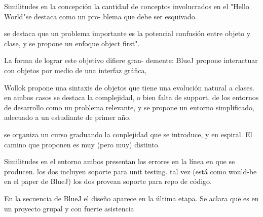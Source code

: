 Similitudes en la concepción
la cantidad de conceptos involucrados en el "Hello World"se destaca como un pro-
blema que debe ser esquivado.

se destaca que un problema importante es la potencial confusión entre objeto y clase,
y se propone un enfoque object first". 


La forma de lograr este objetivo difiere gran-
demente: BlueJ propone interactuar con objetos por medio de una interfaz gráfica,

Wollok propone una sintaxis de objetos que tiene una evolución natural a clases.
en ambos casos se destaca la complejidad, o bien falta de support, de los entornos
de desarrollo como un problema relevante, y se propone un entorno simplificado,
adecuado a un estudiante de primer año.

se organiza un curso graduando la conplejidad que se introduce, y en espiral. El
camino que proponen es muy (pero muy) distinto.

Similitudes en el entorno
ambos presentan los errores en la línea en que se producen.
los dos incluyen soporte para unit testing.
tal vez (está como would-be en el paper de BlueJ) los dos provean soporte para repo
de código.


En la secuencia de BlueJ el diseño aparece en la última etapa. Se aclara que es en un
proyecto grupal y con fuerte asistencia